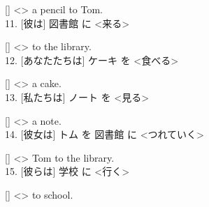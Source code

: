 \documentclass[uplatex,
paper=a4,
fontsize=18pt,
jafontsize=16pt,
number_of_lines=30,
line_length=30zh,
baselineskip=25pt,
]{jlreq}
\begin{document}
  [\hspace{3em}] <\hspace{3em}> a pencil to Tom.
\\

11.  [彼は] 図書館 に <来る>

  [\hspace{3em}] <\hspace{3em}> to the library.
\\

12.  [あなたたちは] ケーキ を <食べる>

  [\hspace{3em}] <\hspace{3em}> a cake.
\\

13.  [私たちは] ノート を <見る>

  [\hspace{3em}] <\hspace{3em}> a note.
\\

14.  [彼女は] トム を 図書館 に <つれていく>

  [\hspace{3em}] <\hspace{3em}> Tom to the library.
\\

15.  [彼らは] 学校 に <行く>

  [\hspace{3em}] <\hspace{3em}> to school.
\\
\end{document}
